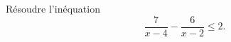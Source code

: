 
\begin{exercice}\label{exoPremiere-0085}

    Résoudre l'inéquation
    \begin{equation}
        \frac{ 7 }{ x-4 }-\frac{ 6 }{ x-2 }\leq 2.
    \end{equation}

\end{exercice}
